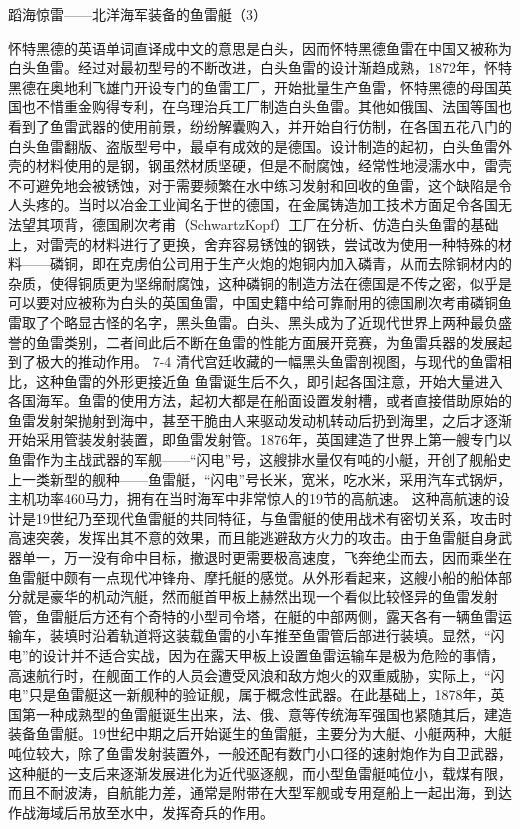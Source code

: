 \documentclass[12pt,UTF8]{ctexbook}
\begin{document}
蹈海惊雷——北洋海军装备的鱼雷艇（3）

怀特黑德的英语单词直译成中文的意思是白头，因而怀特黑德鱼雷在中国又被称为白头鱼雷。经过对最初型号的不断改进，白头鱼雷的设计渐趋成熟，1872年，怀特黑德在奥地利飞雄门开设专门的鱼雷工厂，开始批量生产鱼雷，怀特黑德的母国英国也不惜重金购得专利，在乌理治兵工厂制造白头鱼雷。其他如俄国、法国等国也看到了鱼雷武器的使用前景，纷纷解囊购入，并开始自行仿制，在各国五花八门的白头鱼雷翻版、盗版型号中，最卓有成效的是德国。设计制造的起初，白头鱼雷外壳的材料使用的是钢，钢虽然材质坚硬，但是不耐腐蚀，经常性地浸濡水中，雷壳不可避免地会被锈蚀，对于需要频繁在水中练习发射和回收的鱼雷，这个缺陷是令人头疼的。当时以冶金工业闻名于世的德国，在金属铸造加工技术方面足令各国无法望其项背，德国刷次考甫（SchwartzKopf）工厂在分析、仿造白头鱼雷的基础上，对雷壳的材料进行了更换，舍弃容易锈蚀的钢铁，尝试改为使用一种特殊的材料——磷铜，即在克虏伯公司用于生产火炮的炮铜内加入磷青，从而去除铜材内的杂质，使得铜质更为坚绵耐腐蚀，这种磷铜的制造方法在德国是不传之密，似乎是可以要对应被称为白头的英国鱼雷，中国史籍中给可靠耐用的德国刷次考甫磷铜鱼雷取了个略显古怪的名字，黑头鱼雷。白头、黑头成为了近现代世界上两种最负盛誉的鱼雷类别，二者间此后不断在鱼雷的性能方面展开竞赛，为鱼雷兵器的发展起到了极大的推动作用。
7-4
清代宫廷收藏的一幅黑头鱼雷剖视图，与现代的鱼雷相比，这种鱼雷的外形更接近鱼
鱼雷诞生后不久，即引起各国注意，开始大量进入各国海军。鱼雷的使用方法，起初大都是在船面设置发射槽，或者直接借助原始的鱼雷发射架抛射到海中，甚至干脆由人来驱动发动机转动后扔到海里，之后才逐渐开始采用管装发射装置，即鱼雷发射管。1876年，英国建造了世界上第一艘专门以鱼雷作为主战武器的军舰——“闪电”号，这艘排水量仅有吨的小艇，开创了舰船史上一类新型的舰种——鱼雷艇，“闪电”号长米，宽米，吃水米，采用汽车式锅炉，主机功率460马力，拥有在当时海军中非常惊人的19节的高航速。 这种高航速的设计是19世纪乃至现代鱼雷艇的共同特征，与鱼雷艇的使用战术有密切关系，攻击时高速突袭，发挥出其不意的效果，而且能逃避敌方火力的攻击。由于鱼雷艇自身武器单一，万一没有命中目标，撤退时更需要极高速度，飞奔绝尘而去，因而乘坐在鱼雷艇中颇有一点现代冲锋舟、摩托艇的感觉。从外形看起来，这艘小船的船体部分就是豪华的机动汽艇，然而艇首甲板上赫然出现一个看似比较怪异的鱼雷发射管，鱼雷艇后方还有个奇特的小型司令塔，在艇的中部两侧，露天各有一辆鱼雷运输车，装填时沿着轨道将这装载鱼雷的小车推至鱼雷管后部进行装填。显然，“闪电”的设计并不适合实战，因为在露天甲板上设置鱼雷运输车是极为危险的事情，高速航行时，在舰面工作的人员会遭受风浪和敌方炮火的双重威胁，实际上，“闪电”只是鱼雷艇这一新舰种的验证舰，属于概念性武器。在此基础上，1878年，英国第一种成熟型的鱼雷艇诞生出来，法、俄、意等传统海军强国也紧随其后，建造装备鱼雷艇。19世纪中期之后开始诞生的鱼雷艇，主要分为大艇、小艇两种，大艇吨位较大，除了鱼雷发射装置外，一般还配有数门小口径的速射炮作为自卫武器，这种艇的一支后来逐渐发展进化为近代驱逐舰，而小型鱼雷艇吨位小，载煤有限，而且不耐波涛，自航能力差，通常是附带在大型军舰或专用趸船上一起出海，到达作战海域后吊放至水中，发挥奇兵的作用。
\end{document}

